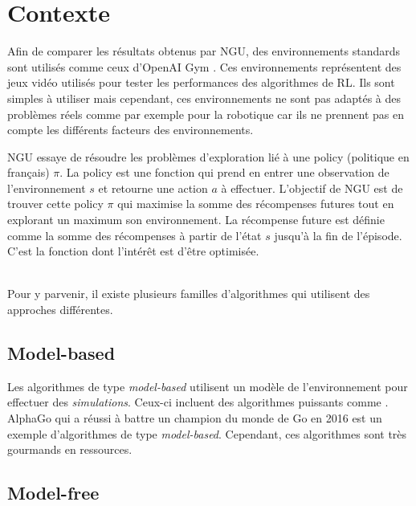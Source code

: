 \section{Contexte}






Afin de comparer les résultats obtenus par NGU, des environnements standards sont utilisés comme ceux d'OpenAI Gym \cite{OpenAI_Gym}. Ces environnements représentent des jeux vidéo utilisés pour tester les performances des algorithmes de RL. Ils sont simples à utiliser mais cependant, ces environnements ne sont pas adaptés à des problèmes réels comme par exemple pour la robotique car ils ne prennent pas en compte les différents facteurs des environnements.

NGU essaye de résoudre les problèmes d'exploration lié à une policy (politique en français) $\pi$. La policy est une fonction qui prend en entrer une observation de l'environnement $s$ et retourne une action $a$ à effectuer. L'objectif de NGU est de trouver cette policy $\pi$ qui maximise la somme des récompenses futures tout en explorant un maximum son environnement. La récompense future est définie comme la somme des récompenses à partir de l'état $s$ jusqu'à la fin de l'épisode. C'est la fonction dont l'intérêt est d'être optimisée.

~\\
Pour y parvenir, il existe plusieurs familles d'algorithmes qui utilisent des approches différentes.

\subsection{Model-based}

Les algorithmes de type \textit{model-based} utilisent un modèle de l'environnement pour effectuer des \textit{simulations}. Ceux-ci incluent des algorithmes puissants comme . AlphaGo qui a réussi à battre un champion du monde de Go en 2016 est un exemple d'algorithmes de type \textit{model-based}. Cependant, ces algorithmes sont très gourmands en ressources.

\subsection{Model-free}

